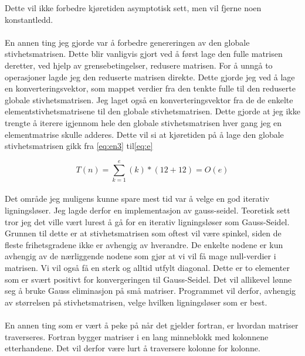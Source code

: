 \documentclass[10pt,a4paper, norsk]{article}
\begin{document}
Dette vil ikke forbedre kjøretiden asymptotisk sett, men vil fjerne noen konstantledd.

\paragraph*{}
En annen ting jeg gjorde var å forbedre genereringen av den globale stivhetsmatrisen. Dette blir vanligvis gjort ved å først lage den fulle matrisen deretter, ved hjelp av grensebetingelser, redusere matrisen. For å unngå to operasjoner lagde jeg den reduserte matrisen direkte. Dette gjorde jeg ved å lage en konverteringsvektor, som mappet verdier fra den tenkte fulle til den reduserte globale stivhetsmatrisen. Jeg laget også en konverteringsvektor fra de de enkelte elementstivhetsmatrisene til den globale stivhetsmatrisen. Dette gjorde at jeg ikke trengte å iterere igjennom hele den globale stivhetsmatrisen hver gang jeg en elementmatrise skulle adderes. Dette vil si at kjøretiden på å lage den globale stivhetsmatrisen gikk fra \eqref{eq:en3} til\eqref{eq:e}

\begin{equation} \label{eq:e}
T(n) = \sum_{k=1}^{e} (k)*(12+12)= O(e)
\end{equation}  

\paragraph*{}
Det område jeg muligens kunne spare mest tid var å velge en god iterativ ligningsløser. Jeg lagde derfor en implementasjon av gauss-seidel. Teoretisk sett tror jeg det ville vært lurest å gå for en iterativ ligningsløser som Gauss-Seidel. Grunnen til dette er at stivhetsmatrisen som oftest vil være spinkel, siden de fleste frihetsgradene ikke er avhengig av hverandre. De enkelte nodene er kun avhengig av de nærliggende nodene som gjør at vi vil få mage null-verdier i matrisen. Vi vil også få en sterk og alltid utfylt diagonal. Dette er to elementer som er svært positivt for konvergeringen til Gauss-Seidel. Det vil allikevel lønne seg å bruke Gauss eliminasjon på små matriser. Programmet vil derfor, avhengig av størrelsen på stivhetsmatrisen, velge hvilken ligningsløser som er best. 

\paragraph*{}
En annen ting som er vært å peke på når det gjelder fortran, er hvordan matriser traverseres. Fortran bygger matriser i en lang minneblokk med kolonnene etterhandene. Det vil derfor være lurt å traversere kolonne for kolonne. 
\end{document}
